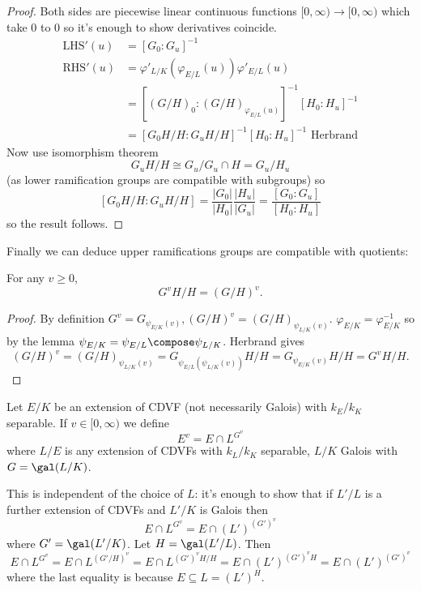 \documentclass[a4paper]{article}
\begin{document}
\begin{proof}
  Both sides are piecewise linear continuous functions \([0, \infty) \to [0, \infty)\) which take \(0\) to \(0\) so it's enough to show derivatives coincide.
  \begin{align*}
    \mathrm{LHS}'(u) &= [G_0 : G_u]^{-1} \\
    \mathrm{RHS}'(u) &= \varphi'_{L/K}(\varphi_{E/L}(u)) \varphi'_{E/L}(u) \\
                    &= [(G/H)_0: (G/H)_{\varphi_{E/L}(u)}]^{-1} [H_0 : H_u]^{-1} \\
                    &= [G_0H/H: G_uH/H]^{-1} [H_0: H_u]^{-1}  \text{ Herbrand}
  \end{align*}
  Now use isomorphism theorem
  \[
    G_uH/H \cong G_u/G_u \cap H = G_u/H_u
  \]
  (as lower ramification groups are compatible with subgroups) so
  \[
    [G_0H/H : G_uH/H] = \frac{|G_0|}{|H_0|} \frac{|H_u|}{|G_u|} = \frac{[G_0: G_u]}{[H_0: H_u]}
  \]
  so the result follows.
\end{proof}

Finally we can deduce upper ramifications groups are compatible with quotients:

\begin{theorem}
  For any \(v \geq 0\),
  \[
    G^vH/H = (G/H)^v.
  \]
\end{theorem}

\begin{proof}
  By definition \(G^v = G_{\psi_{E/K}(v)}, (G/H)^v = (G/H)_{\psi_{L/K}(v)}\). \(\varphi_{E/K} = \varphi^{-1}_{E/K}\) so by the lemma \(\psi_{E/K} = \psi_{E/L} \compose \psi_{L/K}\). Herbrand gives
  \[
    (G/H)^v = (G/H)_{\psi_{L/K}(v)} = G_{\psi_{E/L}(\psi_{L/K}(v))} H/H
    = G_{\psi_{E/K}(v)} H/H = G^vH/H.
  \]
\end{proof}

\begin{definition}
  Let \(E/K\) be an extension of CDVF (not necessarily Galois) with \(k_E/k_K\) separable. If \(v \in [0, \infty)\) we define
  \[
    E^v = E \cap L^{G^v}
  \]
  where \(L/E\) is any extension of CDVFs with \(k_L/k_K\) separable, \(L/K\) Galois with \(G = \gal(L/K)\).
\end{definition}

This is independent of the choice of \(L\): it's enough to show that if \(L'/L\) is a further extension of CDVFs and \(L'/K\) is Galois then
\[
  E \cap L^{G^v} = E \cap (L')^{(G')^v}
\]
where \(G' = \gal(L'/K)\). Let \(H = \gal(L'/L)\). Then
\[
  E \cap L^{G^v} = E \cap L^{(G'/H)^v} = E \cap L^{(G')^vH/H} = E \cap (L')^{(G')^v H} = E \cap (L')^{(G')^v}
\]
where the last equality is because \(E \subseteq L = (L')^H\).
\end{document}
